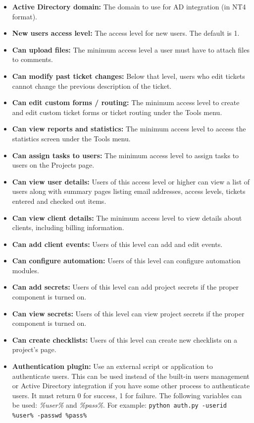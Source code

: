\documentclass[11pt]{article}
\begin{document}
\begin{itemize}
\item \textbf{Active Directory domain:} The domain to use for AD integration (in NT4 format).
\item \textbf{New users access level:} The access level for new users. The default is 1.
\item \textbf{Can upload files:} The minimum access level a user must have to attach files to comments.
\item \textbf{Can modify past ticket changes:} Below that level, users who edit tickets cannot change the previous description of the ticket.
\item \textbf{Can edit custom forms / routing:} The minimum access level to create and edit custom ticket forms or ticket routing under the Tools menu.
\item \textbf{Can view reports and statistics:} The minimum access level to access the statistics screen under the Tools menu.
\item \textbf{Can assign tasks to users:} The minimum access level to assign tasks to users on the Projects page.
\item \textbf{Can view user details:} Users of this access level or higher can view a list of users along with summary pages listing email addresses, access levels, tickets entered and checked out items.
\item \textbf{Can view client details:} The minimum access level to view details about clients, including billing information.
\item \textbf{Can add client events:} Users of this level can add and edit events.
\item \textbf{Can configure automation:} Users of this level can configure automation modules.
\item \textbf{Can add secrets:} Users of this level can add project secrets if the proper component is turned on.
\item \textbf{Can view secrets:} Users of this level can view project secrets if the proper component is turned on.
\item \textbf{Can create checklists:} Users of this level can create new checklists on a project's page.
\item \textbf{Authentication plugin:} Use an external script or application to authenticate users. This can be used instead of the built-in users management or Active Directory integration if you have some other process to authenticate users. It must return 0 for success, 1 for failure. The following variables can be used: \textit{\%user\%} and \textit{\%pass\%}. For example: \texttt{python auth.py -userid \%user\% -passwd \%pass\%}

\end{itemize}
\end{document}
